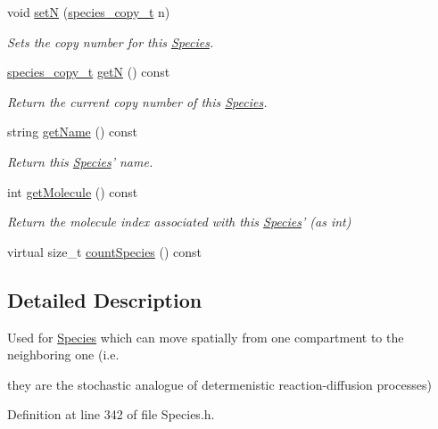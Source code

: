\begin{DoxyCompactItemize}
void \hyperlink{classSpecies_a88de7cf5130cb9cee2da3585374db654}{set\+N} (\hyperlink{common_8h_a3503f321fd36304ee274141275cca586}{species\+\_\+copy\+\_\+t} n)
\begin{DoxyCompactList}\small\item\em Sets the copy number for this \hyperlink{classSpecies}{Species}. \end{DoxyCompactList}\item 
\hyperlink{common_8h_a3503f321fd36304ee274141275cca586}{species\+\_\+copy\+\_\+t} \hyperlink{classSpecies_aea7327b3fed261c705b4d32b9973aa58}{get\+N} () const 
\begin{DoxyCompactList}\small\item\em Return the current copy number of this \hyperlink{classSpecies}{Species}. \end{DoxyCompactList}\item 
string \hyperlink{classSpecies_a28fa239dded841133760ff9c47af63a1}{get\+Name} () const 
\begin{DoxyCompactList}\small\item\em Return this \hyperlink{classSpecies}{Species}' name. \end{DoxyCompactList}\item 
int \hyperlink{classSpecies_a1ea8969c51bc69879891a408f9e197c7}{get\+Molecule} () const 
\begin{DoxyCompactList}\small\item\em Return the molecule index associated with this \hyperlink{classSpecies}{Species}' (as int) \end{DoxyCompactList}\item 
virtual size\+\_\+t \hyperlink{classSpecies_a1864e111fe0304ca8d6b2d0d955a7356}{count\+Species} () const 
\end{DoxyCompactItemize}


\subsection{Detailed Description}
Used for \hyperlink{classSpecies}{Species} which can move spatially from one compartment to the neighboring one (i.\+e. 

they are the stochastic analogue of determenistic reaction-\/diffusion processes) 

Definition at line 342 of file Species.\+h.



